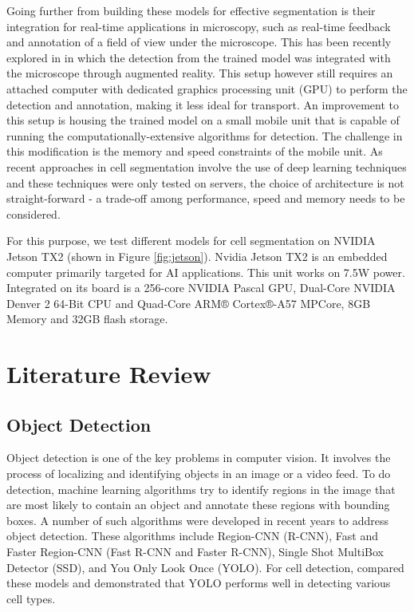\documentclass[10pt, journal, compsoc]{IEEEtran}
\begin{document}
Going further from building these models for effective segmentation is their integration for real-time applications in microscopy, such as real-time feedback and annotation of a field of view under the microscope. This has been recently explored in \cite{Waithe544833} in which the detection from the trained model was integrated with the microscope through augmented reality. This setup however still requires an attached computer with dedicated graphics processing unit (GPU) to perform the detection and annotation, making it less ideal for transport. %
An improvement to this setup is housing the trained model on a small mobile unit that is capable of running the computationally-extensive algorithms for detection. The challenge in this modification is the memory and speed constraints of the mobile unit. As recent approaches in cell segmentation involve the use of deep learning techniques and these techniques were only tested on servers, the choice of architecture is not straight-forward - a trade-off among performance, speed and memory needs to be considered.

For this purpose, we test different models for cell segmentation on NVIDIA Jetson TX2\cite{jetson} (shown in Figure \ref{fig:jetson}). Nvidia Jetson TX2 is an embedded computer primarily targeted for AI applications. This unit works on 7.5W power. Integrated on its board is a 256-core NVIDIA Pascal GPU, Dual-Core NVIDIA Denver 2 64-Bit CPU and Quad-Core ARM® Cortex®-A57 MPCore, 8GB Memory and 32GB flash storage.
\section{Literature Review}
\subsection{Object Detection}
Object detection is one of the key problems in computer vision. It involves the process of localizing and identifying objects in an image or a video feed. To do detection, machine learning algorithms try to identify regions in the image that are most likely to contain an object and annotate these regions with bounding boxes. A number of such algorithms were developed in recent years to address object detection. These algorithms include Region-CNN (R-CNN), Fast and Faster Region-CNN (Fast R-CNN and Faster R-CNN), Single Shot MultiBox Detector (SSD), and You Only Look Once (YOLO). For cell detection, \cite{Waithe544833} compared these models and demonstrated that YOLO performs well in detecting various cell types.
\end{document}

